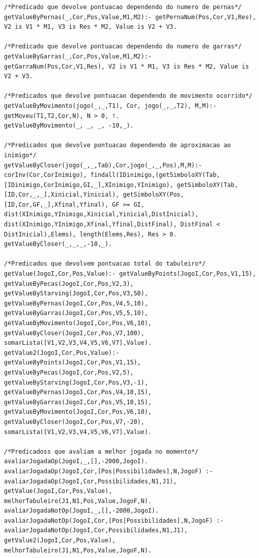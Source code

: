 \documentclass[a4paper]{article}
\begin{document}
\begin{lstlisting}
/*Predicado que devolve pontuacao dependendo do numero de pernas*/
getValueByPernas(_,Cor,Pos,Value,M1,M2):- getPernaNum(Pos,Cor,V1,Res), V2 is V1 * M1, V3 is Res * M2, Value is V2 + V3.

/*Predicado que devolve pontuacao dependendo do numero de garras*/
getValueByGarras(_,Cor,Pos,Value,M1,M2):-   getGarraNum(Pos,Cor,V1,Res), V2 is V1 * M1, V3 is Res * M2, Value is V2 + V3.

/*Predicados que devolve pontuacao dependendo de movimento ocorrido*/
getValueByMovimento(jogo(_,_,T1), Cor, jogo(_,_,T2), M,M):- getMoveu(T1,T2,Cor,N), N > 0, !.
getValueByMovimento(_, _, _, -10,_).

/*Predicados que devolve pontuacao dependendo de aproximacao ao inimigo*/
getValueByCloser(jogo(_,_,Tab),Cor,jogo(_,_,Pos),M,M):- corInv(Cor,CorInimigo), findall(IDinimigo,(getSimboloXY(Tab,[IDinimigo,CorInimigo,GI,_],XInimigo,YInimigo), getSimboloXY(Tab,[ID,Cor,_,_],Xinicial,Yinicial), getSimboloXY(Pos,[ID,Cor,GF,_],Xfinal,Yfinal), GF >= GI, dist(XInimigo,YInimigo,Xinicial,Yinicial,DistInicial), dist(XInimigo,YInimigo,Xfinal,Yfinal,DistFinal), DistFinal < DistInicial),Elems), length(Elems,Res), Res > 0.
getValueByCloser(_,_,_,-10,_).

/*Predicados que devolvem pontuacao total do tabuleiro*/
getValue(JogoI,Cor,Pos,Value):- getValueByPoints(JogoI,Cor,Pos,V1,15), getValueByPecas(JogoI,Cor,Pos,V2,3), getValueByStarving(JogoI,Cor,Pos,V3,50), getValueByPernas(JogoI,Cor,Pos,V4,5,10), getValueByGarras(JogoI,Cor,Pos,V5,5,10), getValueByMovimento(JogoI,Cor,Pos,V6,10), getValueByCloser(JogoI,Cor,Pos,V7,100), somarLista([V1,V2,V3,V4,V5,V6,V7],Value).
getValue2(JogoI,Cor,Pos,Value):- getValueByPoints(JogoI,Cor,Pos,V1,15), getValueByPecas(JogoI,Cor,Pos,V2,5), getValueByStarving(JogoI,Cor,Pos,V3,-1), getValueByPernas(JogoI,Cor,Pos,V4,10,15), getValueByGarras(JogoI,Cor,Pos,V5,10,15), getValueByMovimento(JogoI,Cor,Pos,V6,10), getValueByCloser(JogoI,Cor,Pos,V7,-20), somarLista([V1,V2,V3,V4,V5,V6,V7],Value).

/*Predicadoss que avaliam a melhor jogada no momento*/
avaliarJogadaOp(JogoI,_,[],-2000,JogoI).
avaliarJogadaOp(JogoI,Cor,[Pos|Possibilidades],N,JogoF) :- avaliarJogadaOp(JogoI,Cor,Possibilidades,N1,J1), getValue(JogoI,Cor,Pos,Value), melhorTabuleiro(J1,N1,Pos,Value,JogoF,N).
avaliarJogadaNotOp(JogoI,_,[],-2000,JogoI).
avaliarJogadaNotOp(JogoI,Cor,[Pos|Possibilidades],N,JogoF) :- avaliarJogadaNotOp(JogoI,Cor,Possibilidades,N1,J1), getValue2(JogoI,Cor,Pos,Value), melhorTabuleiro(J1,N1,Pos,Value,JogoF,N).
\end{lstlisting}
\end{document}
